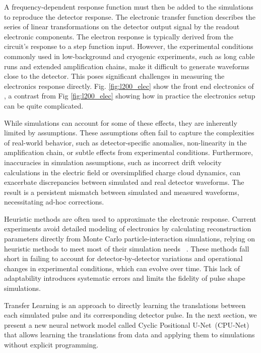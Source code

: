 A frequency-dependent response function must then be added to the simulations to reproduce the detector response. The electronic transfer function describes the series of linear transformations on the detector output signal by the readout electronic components. The electron response is typically derived from the circuit's response to a step function input. However, the experimental conditions commonly used in low-background and cryogenic experiments, such as long cable runs and extended amplification chains, make it difficult to generate waveforms close to the detector. This poses significant challenges in measuring the electronics response directly. Fig. \ref{fig:l200_elec} show the front end electronics of {\Ltwo}, a contrast from Fig \ref{fig:l200_elec} showing how in practice the electronics setup can be quite complicated.

While simulations can account for some of these effects, they are inherently limited by assumptions. These assumptions often fail to capture the complexities of real-world behavior, such as detector-specific anomalies, non-linearity in the amplification chain, or subtle effects from experimental conditions. Furthermore, inaccuracies in simulation assumptions, such as incorrect drift velocity calculations in the electric field or oversimplified charge cloud dynamics, can exacerbate discrepancies between simulated and real detector waveforms. The result is a persistent mismatch between simulated and measured waveforms, necessitating ad-hoc corrections. 

Heuristic methods are often used to approximate the electronic response. Current experiments avoid detailed modeling of electronics by calculating reconstruction parameters directly from Monte Carlo particle-interaction simulations, relying on heuristic methods to meet most of their simulation needs ~\cite{Ben_Thesis,Sam_Thesis}. These methods fall short in failing to account for detector-by-detector variations and operational changes in experimental conditions, which can evolve over time. This lack of adaptability introduces systematic errors and limits the fidelity of pulse shape simulations.


Transfer Learning is an approach to directly learning the translations between each simulated pulse and its corresponding detector pulse. In the next section, we present a new neural network model called Cyclic Positional U-Net~(CPU-Net) that allows learning the translations from data and applying them to simulations without explicit programming.

